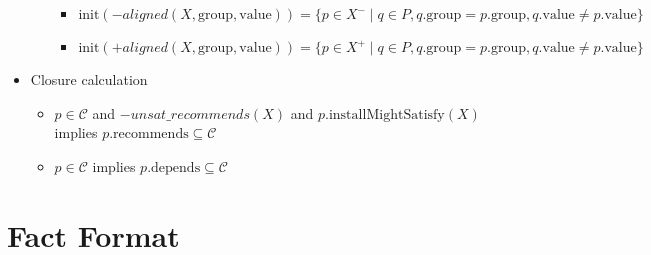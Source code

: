 \documentclass[a4paper,english]{article}
\begin{document}
\begin{itemize}
\begin{itemize}
\begin{itemize}
          \item $\mathrm{init}({-}\mathit{aligned}(X,\mathrm{group},\mathrm{value}))=\{p\in X^{-}\mid q\in P, q.\mathrm{group} = p.\mathrm{group}, q.\mathrm{value} \neq p.\mathrm{value}\}$
          \item $\mathrm{init}({+}\mathit{aligned}(X,\mathrm{group},\mathrm{value}))=\{p\in X^{+}\mid q\in P, q.\mathrm{group} = p.\mathrm{group}, q.\mathrm{value} \neq p.\mathrm{value}\}$
        \end{itemize}
    \end{itemize}
  \item Closure calculation
    \begin{itemize}
      \item $p\in \mathcal{C}$ and ${-}\mathit{unsat\_recommends}(X)$ and $p.\mathrm{installMightSatisfy}(X)$ implies $p.\mathrm{recommends}\subseteq\mathcal{C}$
      \item $p\in \mathcal{C}$ implies $p.\mathrm{depends}\subseteq\mathcal{C}$
    \end{itemize}
\end{itemize}

\section{Fact Format}
\end{document}
